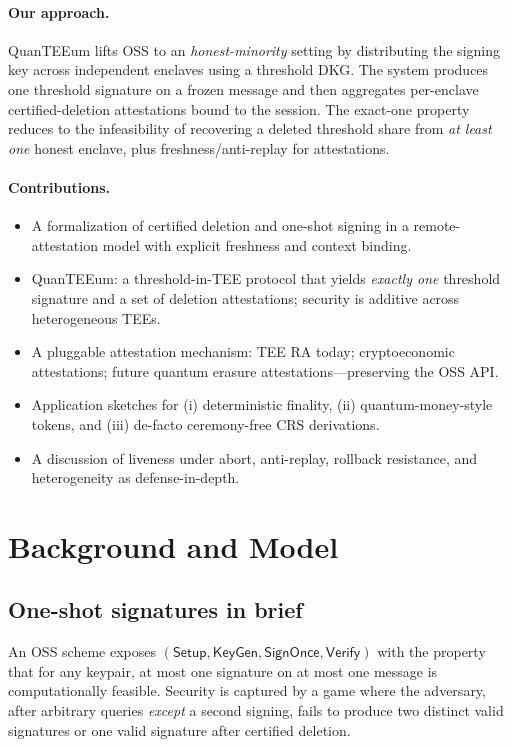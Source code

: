\documentclass[runningheads,orivec]{llncs}
\newcommand{\prot}{\textsf{QuanTEEum}}
\newcommand{\oss}{\textsf{OSS}}
\begin{document}
\paragraph{Our approach.}
\prot{} lifts OSS to an \emph{honest-minority} setting by distributing the signing key across independent enclaves using a threshold DKG. The system produces one threshold signature on a frozen message and then aggregates per-enclave certified-deletion attestations bound to the session. The exact-one property reduces to the infeasibility of recovering a deleted threshold share from \emph{at least one} honest enclave, plus freshness/anti-replay for attestations.

\paragraph{Contributions.}
\begin{itemize}[leftmargin=*,itemsep=0.25em,topsep=0.25em]
  \item A formalization of certified deletion and one-shot signing in a remote-attestation model with explicit freshness and context binding.
  \item \prot{}: a threshold-in-TEE protocol that yields \emph{exactly one} threshold signature and a set of deletion attestations; security is additive across heterogeneous TEEs.
  \item A pluggable attestation mechanism: TEE RA today; cryptoeconomic attestations; future quantum erasure attestations---preserving the OSS API.
  \item Application sketches for (i) deterministic finality, (ii) quantum-money-style tokens, and (iii) de-facto ceremony-free CRS derivations.
  \item A discussion of liveness under abort, anti-replay, rollback resistance, and heterogeneity as defense-in-depth.
\end{itemize}

\section{Background and Model}
\subsection{One-shot signatures in brief}
An \oss{} scheme exposes $(\mathsf{Setup},\mathsf{KeyGen},\mathsf{SignOnce},\mathsf{Verify})$ with the property that for any keypair, at most one signature on at most one message is computationally feasible. Security is captured by a game where the adversary, after arbitrary queries \emph{except} a second signing, fails to produce two distinct valid signatures or one valid signature after certified deletion.
\end{document}
